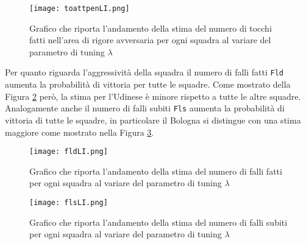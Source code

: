 \begin{figure}[htbp]
	\begin{center}
		\texttt{[image: toattpenLI.png]}
		\caption{Grafico che riporta l'andamento della stima del numero di tocchi fatti nell'area di rigore avversaria per ogni squadra al variare del parametro di tuning $\lambda$} \label{fig:toattpenLI}
	\end{center}
\end{figure}
Per quanto riguarda l'aggressività della squadra il numero di falli fatti \texttt{Fld} aumenta la probabilità di vittoria per tutte le squadre. Come mostrato della Figura \ref{fig:fldLI} però, la stima per l'Udinese è minore rispetto a tutte le altre squadre. Analogamente anche il numero di falli subiti \texttt{Fls} aumenta la probabilità di vittoria di tutte le squadre, in particolare il Bologna si distingue con una stima maggiore come mostrato nella Figura \ref{fig:flsLI}.\\
\begin{figure}[]
	\begin{center}
		\texttt{[image: fldLI.png]}
		\caption{Grafico che riporta l'andamento della stima del numero di falli fatti per ogni squadra al variare del parametro di tuning $\lambda$} \label{fig:fldLI}
	\end{center}
\end{figure}
\begin{figure}[htbp]
	\begin{center}
		\texttt{[image: flsLI.png]}
		\caption{Grafico che riporta l'andamento della stima del numero di falli subiti per ogni squadra al variare del parametro di tuning $\lambda$} \label{fig:flsLI}
	\end{center}
\end{figure}

